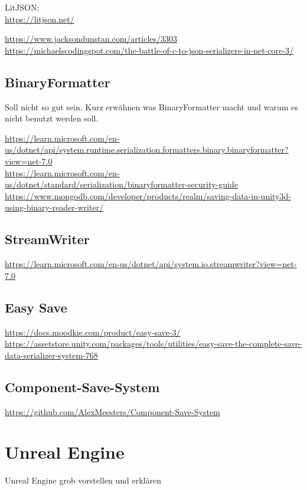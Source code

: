 LitJSON:\\
\url{https://litjson.net/}

\url{https://www.jacksondunstan.com/articles/3303}\\
\url{https://michaelscodingspot.com/the-battle-of-c-to-json-serializers-in-net-core-3/}

\subsection{BinaryFormatter}
Soll nicht so gut sein. Kurz erwähnen was BinaryFormatter macht und warum es nicht benutzt
werden soll.

\url{https://learn.microsoft.com/en-us/dotnet/api/system.runtime.serialization.formatters.binary.binaryformatter?view=net-7.0}\\
\url{https://learn.microsoft.com/en-us/dotnet/standard/serialization/binaryformatter-security-guide}\\
\url{https://www.mongodb.com/developer/products/realm/saving-data-in-unity3d-using-binary-reader-writer/}

\subsection{StreamWriter}
\url{https://learn.microsoft.com/en-us/dotnet/api/system.io.streamwriter?view=net-7.0}

\subsection{Easy Save}
\url{https://docs.moodkie.com/product/easy-save-3/}\\
\url{https://assetstore.unity.com/packages/tools/utilities/easy-save-the-complete-save-data-serializer-system-768}

\subsection{Component-Save-System}

\url{https://github.com/AlexMeesters/Component-Save-System}


\section{Unreal Engine}
Unreal Engine grob vorstellen und erklären

